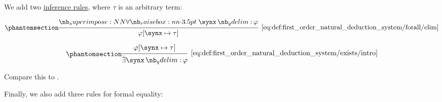 \begin{definition}
\begin{thmenum}
     We add two \hyperref[def:inference_rule]{inference rules}, where \( \tau \) is an arbitrary term:

    \begin{minipage}{0.45\textwidth}
      \begin{equation*}\taglabel[\ensuremath{ \synforall_- }]{eq:def:first_order_natural_deduction_system/forall/elim}
        \begin{prooftree}
          \hypo{ \qforall \synx \varphi }
          \infer1[\ref{eq:def:first_order_natural_deduction_system/forall/elim}]{ \varphi[\synx \mapsto \tau] }
        \end{prooftree}
      \end{equation*}
    \end{minipage}
    \hfill
    \begin{minipage}{0.45\textwidth}
      \begin{equation*}\taglabel[\ensuremath{ \synexists_+ }]{eq:def:first_order_natural_deduction_system/exists/intro}
        \begin{prooftree}
          \hypo{ \varphi[\synx \mapsto \tau] }
          \infer1[\ref{eq:def:first_order_natural_deduction_system/exists/intro}]{ \qexists \synx \varphi }
        \end{prooftree}
      \end{equation*}
    \end{minipage}

    Compare this to .

     Finally, we also add three rules for formal equality:


\end{thmenum}
\end{definition}
